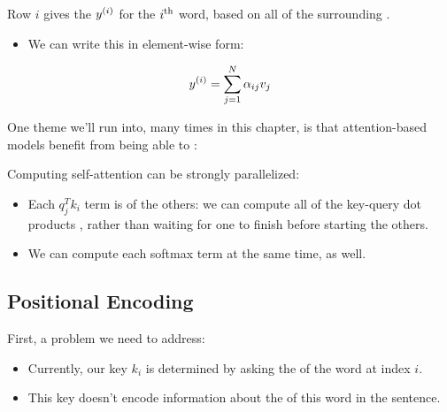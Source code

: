         Row $i$ gives the  $y^{(i)}$ for the $i^{ \text{th} }$ word, based on all of the surrounding . 

        \begin{itemize}
            \item We can write this in element-wise form:
        \end{itemize}

        $$y^{(i)} = \sum_{j=1}^N \alpha_{ij} v_j$$

        One theme we'll run into, many times in this chapter, is that attention-based models benefit from being able to :\\

        \begin{concept}
        
            Computing self-attention can be strongly parallelized:

            \begin{itemize}
                \item Each $q_j^Tk_i$ term is  of the others: we can compute all of the key-query dot products , rather than waiting for one to finish before starting the others.
                \item We can compute each softmax term at the same time, as well.
            \end{itemize}
        \end{concept}



\pagebreak

\subsection{Positional Encoding}

    First, a problem we need to address:

    \begin{itemize}
        \item Currently, our key $k_i$ is determined by asking the  of the word at index $i$.

        \item This key doesn't encode information about the  of this word in the sentence.
    \end{itemize}

